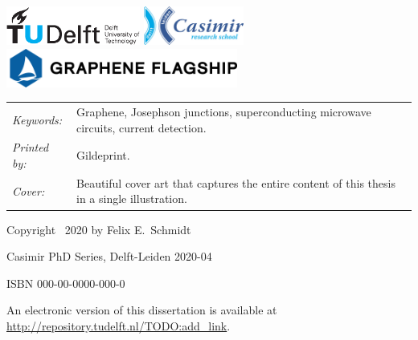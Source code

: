 \begin{titlepage}

\vfill
\begin{center}
    \centering
    \includegraphics[height=0.5in]{title/logos/tudelft}
    \hspace{2em}
    \includegraphics[height=0.5in]{title/logos/casimir}
    \vspace{0.5cm}\newline
    \includegraphics[height=0.5in]{title/logos/flagship}
\end{center}
\vfill

\noindent
\begin{tabular}{@{}p{}@{}p{}}
    \textit{Keywords:} & Graphene, Josephson junctions, superconducting microwave circuits, current detection. \\
    \textit{Printed by:} &  Gildeprint. \\
    \textit{Cover:} & Beautiful cover art that captures the entire content of this thesis in a single illustration.
\end{tabular}

\vspace{4\bigskipamount}

\noindent Copyright \textcopyright\ 2020 by Felix E.~Schmidt

\noindent Casimir PhD Series, Delft-Leiden 2020-04

\medskip
\noindent ISBN 000-00-0000-000-0

\medskip
\noindent An electronic version of this dissertation is available at \\
\url{http://repository.tudelft.nl/TODO:add_link}.

\end{titlepage}

